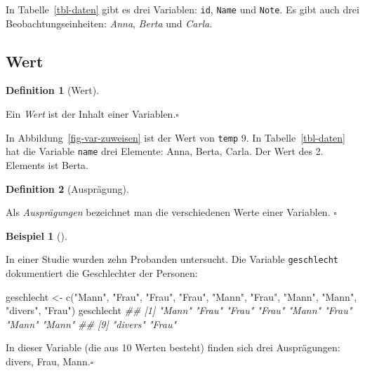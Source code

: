 \documentclass[
  a4paper,
  DIV=11]{scrreprt}
\newenvironment{Shaded}{\begin{snugshade}}{\end{snugshade}}
\newcommand{\DocumentationTok}[1]{\textcolor[rgb]{0.37,0.37,0.37}{\textit{#1}}}
\newcommand{\FunctionTok}[1]{\textcolor[rgb]{0.28,0.35,0.67}{#1}}
\newcommand{\NormalTok}[1]{\textcolor[rgb]{0.00,0.23,0.31}{#1}}
\newcommand{\OtherTok}[1]{\textcolor[rgb]{0.00,0.23,0.31}{#1}}
\newcommand{\StringTok}[1]{\textcolor[rgb]{0.13,0.47,0.30}{#1}}
\theoremstyle{definition}
\theoremstyle{definition}
\newtheorem{example}{Beispiel}[chapter]
\theoremstyle{definition}
\newtheorem{definition}{Definition}[chapter]
\theoremstyle{remark}
\begin{document}
In Tabelle~\ref{tbl-daten} gibt es drei Variablen: \texttt{id},
\texttt{Name} und \texttt{Note}. Es gibt auch drei
Beobachtungseinheiten: \emph{Anna}, \emph{Berta} und \emph{Carla.}

\subsection{Wert}\label{wert}

\begin{definition}[Wert]\protect\hypertarget{def-wert}{}\label{def-wert}

Ein \emph{Wert} ist der Inhalt einer Variablen.\(\square\)

\end{definition}

In Abbildung~\ref{fig-var-zuweisen} ist der Wert von \texttt{temp} 9. In
Tabelle~\ref{tbl-daten} hat die Variable \texttt{name} drei Elemente:
Anna, Berta, Carla. Der Wert des 2. Elements ist Berta.

\begin{definition}[Ausprägung]\protect\hypertarget{def-auspraegung}{}\label{def-auspraegung}

Als \emph{Ausprägungen} bezeichnet man die verschiedenen Werte einer
Variablen. \(\square\)

\end{definition}

\begin{example}[]\protect\hypertarget{exm-geschlecht}{}\label{exm-geschlecht}

In einer Studie wurden zehn Probanden untersucht. Die Variable
\texttt{geschlecht} dokumentiert die Geschlechter der Personen:

\begin{Shaded}
\begin{Highlighting}[]
\NormalTok{geschlecht }\OtherTok{\textless{}{-}} \FunctionTok{c}\NormalTok{(}\StringTok{"Mann"}\NormalTok{, }\StringTok{"Frau"}\NormalTok{, }\StringTok{"Frau"}\NormalTok{, }\StringTok{"Frau"}\NormalTok{, }\StringTok{"Mann"}\NormalTok{,}
                \StringTok{"Frau"}\NormalTok{, }\StringTok{"Mann"}\NormalTok{, }\StringTok{"Mann"}\NormalTok{, }\StringTok{"divers"}\NormalTok{, }\StringTok{"Frau"}\NormalTok{)}
\NormalTok{geschlecht}
\DocumentationTok{\#\#  [1] "Mann"   "Frau"   "Frau"   "Frau"   "Mann"   "Frau"   "Mann"   "Mann"  }
\DocumentationTok{\#\#  [9] "divers" "Frau"}
\end{Highlighting}
\end{Shaded}

In dieser Variable (die aus 10 Werten besteht) finden sich drei
Ausprägungen: divers, Frau, Mann.\(\square\)

\end{example}
\end{document}
